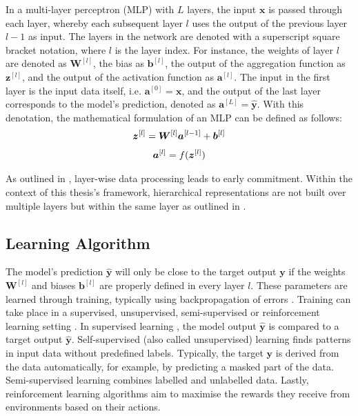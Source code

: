 In a multi-layer perceptron (MLP) with $L$ layers, the input \(\boldsymbol{x}\) is passed through each layer, whereby each subsequent layer \(l\) uses the output of the previous layer \(l-1\) as input.
The layers in the network are denoted with a superscript square bracket notation, where $l$ is the layer index. 
For instance, the weights of layer $l$ are denoted as $\boldsymbol{W}^{[l]}$, the bias as \(\boldsymbol{b}^{[l]}\), the output of the aggregation function as \(\boldsymbol{z}^{[l]}\), and the output of the activation function as \(\boldsymbol{a}^{[l]}\).
The input in the first layer is the input data itself, i.e. $\boldsymbol{a}^{[0]} = \boldsymbol{x}$, and the output of the last layer corresponds to the model's prediction, denoted as $\boldsymbol{a}^{[L]} = \hat{\boldsymbol{y}}$. With this denotation, the mathematical formulation of an MLP can be defined as follows:
%
\begin{align}\eqlbl{mlp}
		\boldsymbol{z}^{[l]} = \boldsymbol{W}^{[l]}\boldsymbol{a}^{[l-1]} + \boldsymbol{b}^{[l]}
\end{align}
%
\begin{align}\eqlbl{mlp2}
		\boldsymbol{a}^{[l]} = f(\boldsymbol{z}^{[l]})
\end{align}

As outlined in , layer-wise data processing leads to early commitment. Within the context of this thesis's framework, hierarchical representations are not built over multiple layers but within the same layer as outlined in .


\subsection{Learning Algorithm}
The model's prediction $\boldsymbol{\hat{y}}$ will only be close to the target output $\boldsymbol{y}$ if the weights $\boldsymbol{W}^{[l]}$ and biases $\boldsymbol{b}^{[l]}$ are properly defined in every layer $l$.
These parameters are learned through training, typically using backpropagation of errors .
Training can take place in a supervised, unsupervised, semi-supervised or reinforcement learning setting \cite{russell_artificial_2021, simmler_survey_2021}. In supervised learning \cite{cord_supervised_2008}, the model output $\boldsymbol{\hat{y}}$ is compared to a target output $\boldsymbol{\hat{y}}$. Self-supervised (also called unsupervised) learning \cite{liu_self-supervised_2021} finds patterns in input data without predefined labels. Typically, the target $\boldsymbol{y}$ is derived from the data automatically, for example, by predicting a masked part of the data. Semi-supervised learning \cite{van_engelen_survey_2020} combines labelled and unlabelled data. Lastly, reinforcement learning algorithms \cite{arulkumaran_deep_2017} aim to maximise the rewards they receive from environments based on their actions.

